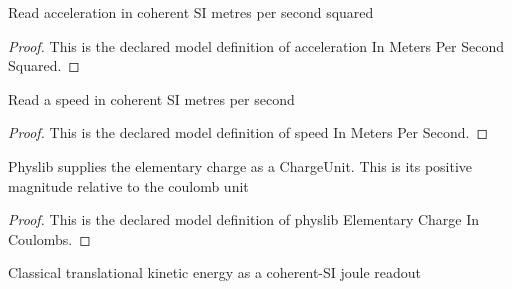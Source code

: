 \begin{definition}
  \label{def:physics:phyx-mini-0908:phyxminiproblems-problemphyxmini0908-accelerationinmeterspersecondsquared}
  Read acceleration in coherent SI metres per second squared
\end{definition}
\begin{proof}
  This is the declared model definition of acceleration In Meters Per Second Squared.
\end{proof}
\begin{definition}
  \label{def:physics:phyx-mini-0908:phyxminiproblems-problemphyxmini0908-speedinmeterspersecond}
  Read a speed in coherent SI metres per second
\end{definition}
\begin{proof}
  This is the declared model definition of speed In Meters Per Second.
\end{proof}
\begin{definition}
  \label{def:physics:phyx-mini-0908:phyxminiproblems-problemphyxmini0908-physlibelementarychargeincoulombs}
  Physlib supplies the elementary charge as a ChargeUnit. This is its positive magnitude relative to the coulomb unit
\end{definition}
\begin{proof}
  This is the declared model definition of physlib Elementary Charge In Coulombs.
\end{proof}
\begin{definition}
  \label{def:physics:phyx-mini-0908:phyxminiproblems-problemphyxmini0908-classicalkineticenergyinjoules}
  Classical translational kinetic energy as a coherent-SI joule readout
\end{definition}
